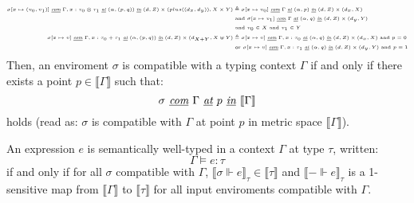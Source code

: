 \begin{definition}
\begin{equation}
\begin{tiny}
\begin{aligned}[c]
      \sigma[x \mapsto (v_0, v_1)] \textit{ \underline{com} }
      \Gamma, x : \tau_0 \otimes \tau_1 \textit{ \underline{at} } (\alpha, (p,
      q))
      \textit{ \underline{in} } (d, Z) \times (plus((d_x, d_y)), X
      \times Y) &\triangleq
      \sigma[x \mapsto v_0] \textit{ \underline{com} } \Gamma \textit{
        \underline{at} } (\alpha, p) \textit{ \underline{in} } (d, Z) \times
      (d_x, X) \\
      & \text{ and } \sigma[x \mapsto v_1] \textit{ \underline{com} } \Gamma
      \textit{ \underline{at} } (\alpha, q) \textit{ \underline{in} } (d, Z)
      \times (d_y, Y) \\
      & \text{ and } v_0 \in X \text{ and } v_1 \in Y \\
      \sigma[x \mapsto v] \textit{ \underline{com} } \Gamma, x : \tau_0 + \tau_1
      \textit{ \underline{at} } (\alpha, (p, q)) \textit{ \underline{in} } (d, Z)
      \times (d_{X + Y}, X \uplus Y) &\triangleq
      \sigma[x \mapsto v] \textit{ \underline{com} } \Gamma, x : \tau_0 \textit{
        \underline{at} } (\alpha, q) \textit{ \underline{in} } (d, Z) \times
      (d_x, X) \text{ and } p = 0 \\
      & \text{ or } \sigma[x \mapsto v] \textit{ \underline{com} } \Gamma, x :
      \tau_1 \textit{ \underline{at} } (\alpha, q) \textit{ \underline{in} } (d,
      Z) \times (d_y, Y) \text{ and } p = 1 \\
    \end{aligned}
    \end{tiny}
  \end{equation}
  Then, an enviroment $\sigma$ is compatible with a typing context $\Gamma$ if
  and only if there exists a point $p \in \llbracket \Gamma \rrbracket$ such
  that: 
  \begin{equation}
    \sigma \textit{ \underline{com} } \Gamma \textit{ \underline{at} } p
    \textit{ \underline{in} } \llbracket \Gamma \rrbracket
  \end{equation}
  holds (read as: $\sigma$ is compatible with $\Gamma$ at point $p$ in metric
  space $\llbracket \Gamma \rrbracket$).
\end{definition}


\begin{definition}
  An expression $e$ is semantically well-typed in a context $\Gamma$ at type
  $\tau$, written:
  $$\Gamma \vDash e : \tau$$
  if and only if for all $\sigma$ compatible with $\Gamma$, $\llbracket
  \sigma \Vdash e \rrbracket_{\tau} \in \llbracket \tau \rrbracket$ and
  $\llbracket - \Vdash e \rrbracket_{\tau}$ is a 1-sensitive map from
  $\llbracket \Gamma \rrbracket$ to $\llbracket \tau \rrbracket$ for all input
  enviroments compatible with $\Gamma$.
\end{definition}

